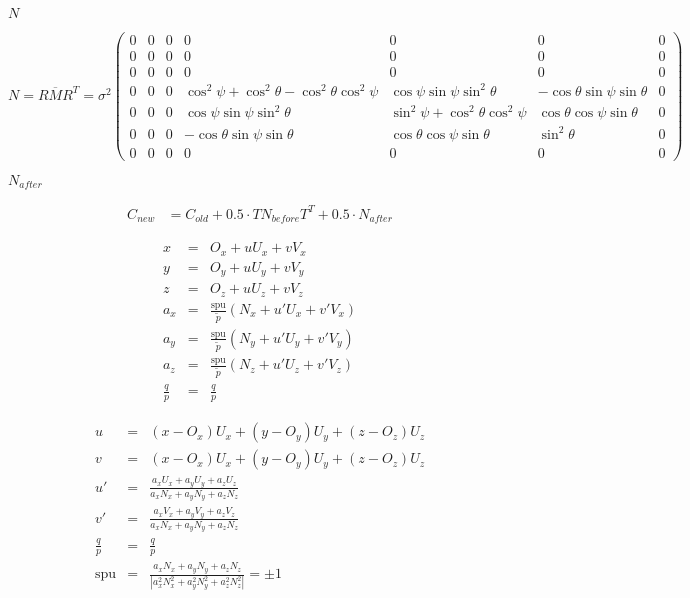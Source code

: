 \documentclass{article}
\begin{document}
$N$
\pagebreak

\[ N=R\overline{M}R^{T}=\sigma^{2}\left(\begin{array}{ccccccc} 0 & 0 & 0 & 0 & 0 & 0 & 0\\ 0 & 0 & 0 & 0 & 0 & 0 & 0\\ 0 & 0 & 0 & 0 & 0 & 0 & 0\\ 0 & 0 & 0 & \cos^{2}\psi+\cos^{2}\theta-\cos^{2}\theta\cos^{2}\psi & \cos\psi\sin\psi\sin^{2}\theta & -\cos\theta\sin\psi\sin\theta & 0\\ 0 & 0 & 0 & \cos\psi\sin\psi\sin^{2}\theta & \sin^{2}\psi+\cos^{2}\theta\cos^{2}\psi & \cos\theta\cos\psi\sin\theta & 0\\ 0 & 0 & 0 & -\cos\theta\sin\psi\sin\theta & \cos\theta\cos\psi\sin\theta & \sin^{2}\theta & 0\\ 0 & 0 & 0 & 0 & 0 & 0 & 0\end{array}\right)\]
\pagebreak

$N_{after}$
\pagebreak

\begin{eqnarray*} C_{new} & = C_{old} + 0.5 \cdot T N_{before} T^{T} + 0.5 \cdot N_{after} \end{eqnarray*}
\pagebreak

\begin{eqnarray*}x & = & O_{x}+uU_{x}+vV_{x}\\y & = & O_{y}+uU_{y}+vV_{y}\\z & = & O_{z}+uU_{z}+vV_{z}\\a_{x} & = & \frac{\mbox{spu}}{\widetilde{p}}\left(N_{x}+u\prime U_{x}+v\prime V_{x}\right)\\a_{y} & = & \frac{\mbox{spu}}{\widetilde{p}}\left(N_{y}+u\prime U_{y}+v\prime V_{y}\right)\\a_{z} & = & \frac{\mbox{spu}}{\widetilde{p}}\left(N_{z}+u\prime U_{z}+v\prime V_{z}\right)\\\frac{q}{p} & = & \frac{q}{p}\end{eqnarray*}
\pagebreak

\begin{eqnarray*}u & = & \left(x-O_{x}\right)U_{x}+\left(y-O_{y}\right)U_{y}+\left(z-O_{z}\right)U_{z}\\v & = & \left(x-O_{x}\right)U_{x}+\left(y-O_{y}\right)U_{y}+\left(z-O_{z}\right)U_{z}\\u\prime & = & \frac{a_{x}U_{x}+a_{y}U_{y}+a_{z}U_{z}}{a_{x}N_{x}+a_{y}N_{y}+a_{z}N_{z}}\\v\prime & = & \frac{a_{x}V_{x}+a_{y}V_{y}+a_{z}V_{z}}{a_{x}N_{x}+a_{y}N_{y}+a_{z}N_{z}}\\\frac{q}{p} & = & \frac{q}{p}\\\mbox{spu} & = & \frac{a_{x}N_{x}+a_{y}N_{y}+a_{z}N_{z}}{|a_{x}^{2}N_{x}^{2}+a_{y}^{2}N_{y}^{2}+a_{z}^{2}N_{z}^{2}|}=\pm1\end{eqnarray*}
\pagebreak
\end{document}
